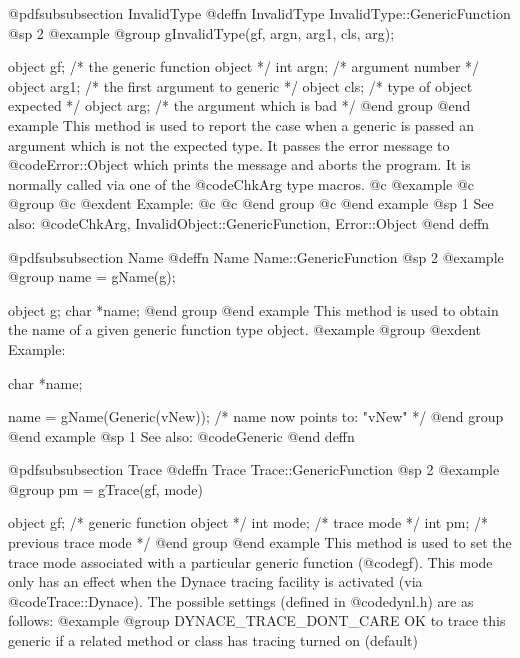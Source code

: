 @pdfsubsubsection {InvalidType}
@deffn {InvalidType} InvalidType::GenericFunction
@sp 2
@example
@group
gInvalidType(gf, argn, arg1, cls, arg);

object  gf;     /*  the generic function object    */
int     argn;   /*  argument number            */
object  arg1;   /*  the first argument to generic  */
object  cls;    /*  type of object expected    */
object  arg;    /*  the argument which is bad  */
@end group
@end example
This method is used to report the case when a generic is passed an
argument which is not the expected type.  It passes the error message to
@code{Error::Object} which prints the message and aborts the program.
It is normally called via one of the @code{ChkArg} type macros.
@c @example
@c @group
@c @exdent Example:
@c 
@c @end group
@c @end example
@sp 1
See also:  @code{ChkArg, InvalidObject::GenericFunction, Error::Object}
@end deffn










@pdfsubsubsection {Name}
@deffn {Name} Name::GenericFunction
@sp 2
@example
@group
name = gName(g);

object  g;
char    *name;
@end group
@end example
This method is used to obtain the name of a given generic function type object.
@example
@group
@exdent Example:

char    *name;

name = gName(Generic(vNew));
/*  name now points to:   "vNew"  */
@end group
@end example
@sp 1
See also:  @code{Generic}
@end deffn













@pdfsubsubsection {Trace}
@deffn {Trace} Trace::GenericFunction
@sp 2
@example
@group
pm = gTrace(gf, mode)

object  gf;     /*  generic function object */
int     mode;   /*  trace mode              */
int     pm;     /*  previous trace mode     */
@end group
@end example
This method is used to set the trace mode associated with a
particular generic function (@code{gf}).  This mode only has an effect
when the Dynace tracing facility is activated (via
@code{Trace::Dynace}).  The possible settings (defined in
@code{dynl.h}) are as follows:
@example
@group
DYNACE_TRACE_DONT_CARE   OK to trace this generic if a
                         related method or class has tracing
                         turned on (default)

